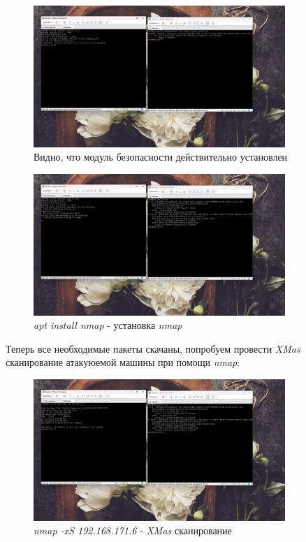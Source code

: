 \documentclass[a4paper]{article}
\begin{document}
  \begin{figure}[H]
    \centering
    \includegraphics[width=0.85\textwidth]{03_00 (36)}
    \caption{Видно, что модуль безопасности действительно установлен}
    \label{img:36}
  \end{figure}

  \begin{figure}[H]
    \centering
    \includegraphics[width=0.85\textwidth]{03_00 (37)}
    \caption{\textit{apt install nmap} - установка \textit{nmap}}
    \label{img:37}
  \end{figure}

  Теперь все необходимые пакеты скачаны, попробуем провести \textit{XMas} сканирование
  атакуюемой машины при помощи \textit{nmap}:

  \begin{figure}[H]
    \centering
    \includegraphics[width=0.85\textwidth]{03_00 (38)}
    \caption{\textit{nmap -xS 192.168.171.6} - \textit{XMas} сканирование}
    \label{img:38}
  \end{figure}
\end{document}
